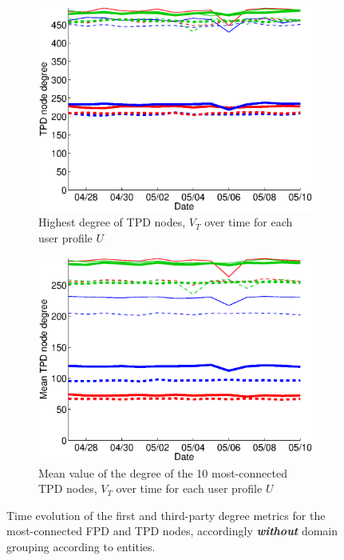 \documentclass{sig-alternate}
\begin{document}
\begin{figure}
  \begin{subfigure}{.38\textwidth}
    \includegraphics[width=\textwidth]{figures/plots/third-mean-top1.eps}
    \caption{Highest degree of TPD nodes, $V_T$ over time for each user profile $U$}
    \label{fig:third_mean_top1_without_entities}
  \end{subfigure}
  \begin{subfigure}{.38\textwidth}
    \includegraphics[width=\textwidth]{figures/plots/third-mean-top10.eps}
    \caption{Mean value of the degree of the 10 most-connected TPD nodes, $V_T$ over time for each user profile $U$}
    \label{fig:third_mean_top10_without_entities}
  \end{subfigure}

  \caption{Time evolution of the first and third-party degree metrics for the most-connected FPD and TPD nodes, accordingly \textbf{\textit{without}} domain grouping according to entities.}
  \label{fig:highest_degree_nodes_without_entities}
  \end{figure}
\end{document}
